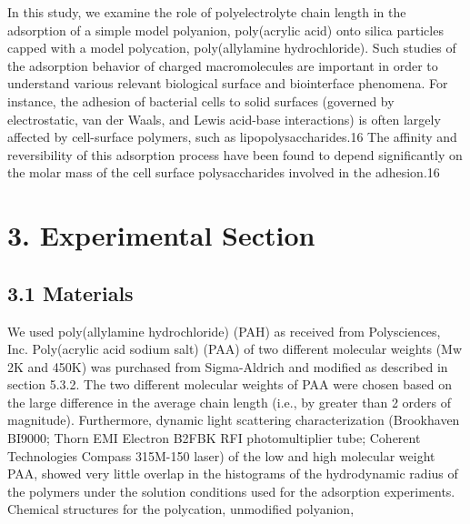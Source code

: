 \documentclass[journal=jacsat,manuscript=article]{achemso}
\begin{document}
In this study, we examine the role of polyelectrolyte chain length in the adsorption of a simple model polyanion, poly(acrylic acid) onto silica particles capped with a model polycation, poly(allylamine hydrochloride).  Such studies of the adsorption behavior of charged macromolecules are important in order to understand various relevant biological surface and biointerface phenomena.  For instance, the adhesion of bacterial cells to solid surfaces (governed by electrostatic, van der Waals, and Lewis acid-base interactions) is often largely affected by cell-surface polymers, such as lipopolysaccharides.16  The affinity and reversibility of this adsorption process have been found to depend significantly on the molar mass of the cell surface polysaccharides involved in the adhesion.16 
\section{3. Experimental Section}

\subsection{3.1 Materials}
We used poly(allylamine hydrochloride) (PAH) as received from Polysciences, Inc. Poly(acrylic acid sodium salt) (PAA) of two different molecular weights (Mw 2K and 450K) was purchased from Sigma-Aldrich and modified as described in section 5.3.2.  The two different molecular weights of PAA were chosen based on the large difference in the average chain length (i.e., by greater than 2 orders of magnitude).  Furthermore, dynamic light scattering characterization (Brookhaven BI9000; Thorn EMI Electron B2FBK RFI photomultiplier tube; Coherent Technologies Compass 315M-150 laser) of the low and high molecular weight PAA, showed very little overlap in the histograms of the hydrodynamic radius of the polymers under the solution conditions used for the adsorption experiments.  Chemical structures for the polycation, unmodified polyanion, 

\end{document}
